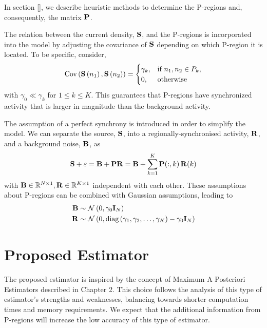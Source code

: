 In section [], we describe heuristic methods to determine the P-regions and, consequently, the matrix $\mathbf{P}$.



The relation between the current density, $\mathbf{S}$, and the P-regions is incorporated into the model by adjusting the covariance of $\mathbf{S}$ depending on which P-region it is located.
%
To be specific, consider,
\begin{equation}
    \text{Cov}\left( \mathbf{S}\left( n_1 \right), \mathbf{S}\left( n_2 \right) \right) = 
    \begin{cases}
        \gamma_k, & \text{if } n_1, n_2\in P_k, \\
        0, & \text{otherwise}
    \end{cases}
\end{equation}
with $\gamma_0 \ll \gamma_k$ for $1\leq k \leq K$.
%
This guarantees that P-regions have synchronized activity that is larger in magnitude than the background activity.

The assumption of a perfect synchrony is introduced in order to simplify the model.
%
We can separate the source, $\mathbf{S}$, into a regionally-synchronised activity, $\mathbf{R}$, and a background noise, $\mathbf{B}$, as
\begin{equation}
    \mathbf{S} +\varepsilon = \mathbf{B} + \mathbf{P} \mathbf{R} = \mathbf{B} + \sum_{k=1}^K \mathbf{P}(:,k)\, \mathbf{R}(k)
    \label{eq:3.4}
\end{equation}
with $\mathbf{B} \in \mathbb{R}^{N\times 1}, \mathbf{R} \in \mathbb{R}^{K\times 1}$ independent with each other.
%
These assumptions about P-regions can be combined with Gaussian assumptions, leading to 
\begin{align}
    \mathbf{B} &\sim \mathcal{N}\left( 0, \gamma_0 \mathbf{I}_N  \right) 
    \label{eq:3.5} \\
    \mathbf{R} &\sim \mathcal{N}\left( 0, \text{diag}\left( \gamma_1, \gamma_2, \dots, \gamma_K \right)-\gamma_0 \mathbf{I}_N  \right)
    \label{eq:3.6}
\end{align}

\section{Proposed Estimator}

The proposed estimator is inspired by the concept of Maximum A Posteriori Estimators described in Chapter 2.
%
This choice follows the analysis of this type of estimator's strengths and weaknesses, balancing towards shorter computation times and memory requirements.
%
We expect that the additional information from P-regions will increase the low accuracy of this type of estimator.

